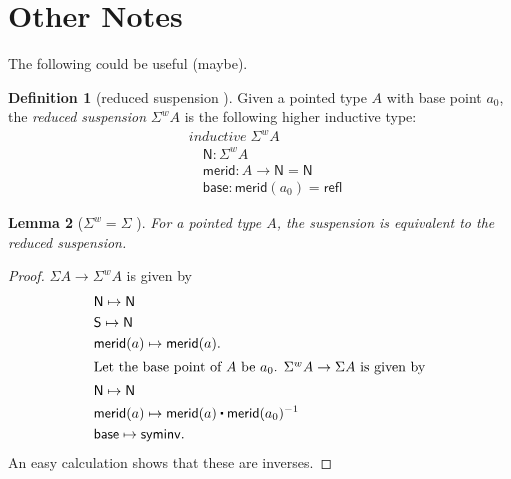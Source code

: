 \documentclass[11pt,a4paper,oneside,reqno]{amsart}
\newtheorem{theorem}{Theorem}
\newtheorem{lemma}[theorem]{Lemma}
\theoremstyle{definition}
\newtheorem{definition}[theorem]{Definition}
\theoremstyle{remark}
\newcommand{\sph}[1]{{\mathbb S}^{#1}}
\newcommand{\refl}{\mathsf{refl}}
\newcommand{\ct}{%
  \mathchoice{\mathbin{\raisebox{0.5ex}{$\displaystyle\centerdot$}}}%
             {\mathbin{\raisebox{0.5ex}{$\centerdot$}}}%
             {\mathbin{\raisebox{0.25ex}{$\scriptstyle\,\centerdot\,$}}}%
             {\mathbin{\raisebox{0.1ex}{$\scriptscriptstyle\,\centerdot\,$}}}
}
\newcommand{\North}{\mathsf N}
\newcommand{\South}{\mathsf S}
\newcommand{\merid}{\mathsf{merid}}
\begin{document}
% 
% 

\appendix

\section{Other Notes}

The following could be useful (maybe).

\begin{definition}[{reduced suspension \cite[Rem 8.6.3]{HoTT}}]
 Given a pointed type $A$ with base point $a_0$, the \emph{reduced suspension} $\Sigma^w A$ is the following higher inductive type:
 \begin{align*}
  & \textit{inductive} \; \Sigma^w A \\
  & \quad \North : \Sigma^w A \\
  & \quad \merid : A \to \North = \North \\
  & \quad \mathsf{base} : \merid(a_0) = \refl
 \end{align*}
\end{definition}

\begin{lemma}[{$\Sigma^w = \Sigma$ \cite[Rem 8.6.3]{HoTT}}]
 For a pointed type $A$, the suspension is equivalent to the reduced suspension.
\end{lemma}
\begin{proof}
  $\Sigma A \to \Sigma^w A$ is given by
 \begin{align*}
  & \North \mapsto \North \\
  & \South \mapsto \North \\
  & \merid(a) \mapsto \merid(a).\\
  \intertext{Let the base point of $A$ be $a_0$.
  $\Sigma^w A \to \Sigma A$ is given by}
  & \North \mapsto \North \\
  & \merid(a) \mapsto \merid(a) \ct \merid(a_0)^{-1} \\
  & \mathsf{base} \mapsto \mathsf{syminv}.
 \end{align*}
 An easy calculation shows that these are inverses.
\end{proof}





\end{document}
